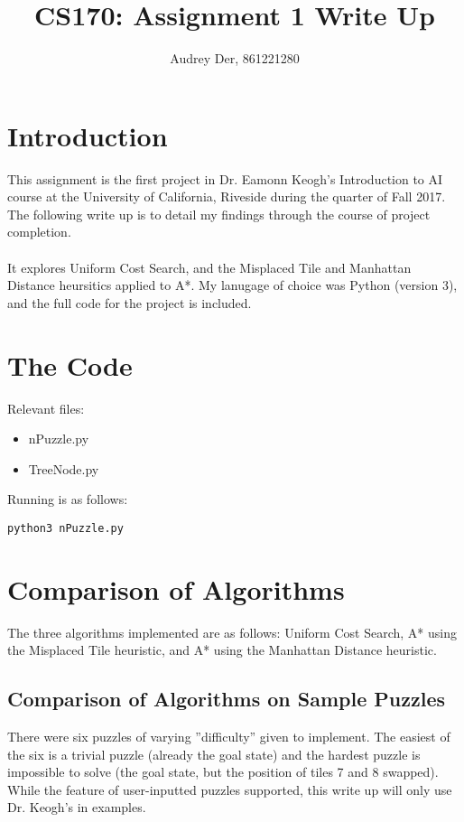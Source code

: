 \documentclass[a4paper]{article}
\title{CS170: Assignment 1 Write Up}
\author{Audrey Der, 861221280}
\begin{document}
\maketitle


\section{Introduction}

This assignment is the first project in Dr. Eamonn Keogh's Introduction to AI
course at the University of California, Riveside during the quarter of Fall
2017. The following write up is to detail my findings through the course of
project completion. \\ \\ It explores Uniform Cost Search, and the Misplaced Tile and
Manhattan Distance heursitics applied to A*. My lanugage of choice was Python
(version 3), and the full code for the project is included.

\section{The Code}
Relevant files:
\begin{itemize}
\item nPuzzle.py
\item TreeNode.py
\end{itemize}

Running is as follows:
\begin{verbatim}
python3 nPuzzle.py
\end{verbatim}

\section{Comparison of Algorithms}
The three algorithms implemented are as follows: Uniform Cost Search, A* using
the Misplaced Tile heuristic, and A* using the Manhattan Distance heuristic.

\subsection{Comparison of Algorithms on Sample Puzzles}
There were six puzzles of varying ''difficulty'' given to implement. The easiest
of the six is a trivial puzzle (already the goal state) and the hardest puzzle
is impossible to solve (the goal state, but the position of tiles 7 and 8
swapped). While the feature of user-inputted puzzles supported, this write up
will only use Dr. Keogh's in examples.
\end{document}
